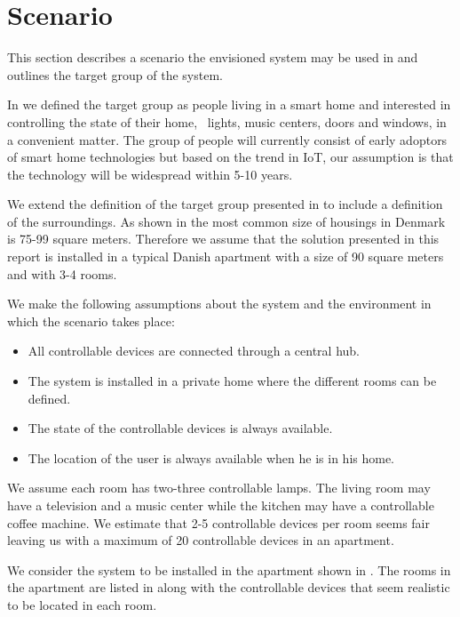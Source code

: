 \section{Scenario}
\label{sec:analysis:scenarios}

This section describes a scenario the envisioned system may be used in and outlines the target group of the system.

In \cite[p. 15]{prespecialisation} we defined the target group as people living in a smart home and interested in controlling the state of their home, \eg~lights, music centers, doors and windows, in a convenient matter. The group of people will currently consist of early adoptors of smart home technologies but based on the trend in IoT, our assumption is that the technology will be widespread within 5-10 years. 

We extend the definition of the target group presented in \cite[p. 15]{prespecialisation} to include a definition of the surroundings. As shown in  the most common size of housings in Denmark is 75-99 square meters. Therefore we assume that the solution presented in this report is installed in a typical Danish apartment with a size of 90 square meters and with 3-4 rooms. 

We make the following assumptions about the system and the environment in which the scenario takes place:

\begin{itemize}
    \item All controllable devices are connected through a central hub.
    \item The system is installed in a private home where the different rooms can be defined.
    \item The state of the controllable devices is always available.
    \item The location of the user is always available when he is in his home.
\end{itemize}

We assume each room has two-three controllable lamps. The living room may have a television and a music center while the kitchen may have a controllable coffee machine. We estimate that 2-5 controllable devices per room seems fair leaving us with a maximum of 20 controllable devices in an apartment.

We consider the system to be installed in the apartment shown in . The rooms in the apartment are listed in  along with the controllable devices that seem realistic to be located in each room.

